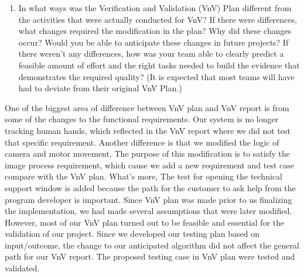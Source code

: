 \documentclass[12pt, titlepage]{article}
\begin{document}
\begin{enumerate}
  \item In what ways was the Verification and Validation (VnV) Plan different
  from the activities that were actually conducted for VnV?  If there were
  differences, what changes required the modification in the plan?  Why did
  these changes occur?  Would you be able to anticipate these changes in future
  projects?  If there weren't any differences, how was your team able to clearly
  predict a feasible amount of effort and the right tasks needed to build the
  evidence that demonstrates the required quality?  (It is expected that most
  teams will have had to deviate from their original VnV Plan.)
  
  
\end{enumerate}
 One of the biggest area of difference between VnV plan and VnV report is from some of the changes to the functional requirements. Our system is no longer tracking human hands, which reflected in the VnV report where we did not test that specific requirement. Another difference is that we modified the logic of camera and motor movement. The purpose of this modification is to satisfy the image process requirement, which cause we add a new requirement and test case compare with the VnV plan. What's more, The test for opening the technical support window is added because the path for the customer to ask help from the program developer is important. Since VnV plan was made prior to us finalizing the implementation, we had made several assumptions that were later modified. However, most of our VnV plan turned out to be feasible and essential for the validation of our project. Since we developed our testing plan based on input/outcome, the change to our anticipated algorithm did not affect the general path for our VnV report. The proposed testing case in VnV plan were tested and validated.
 
 
\end{document}
